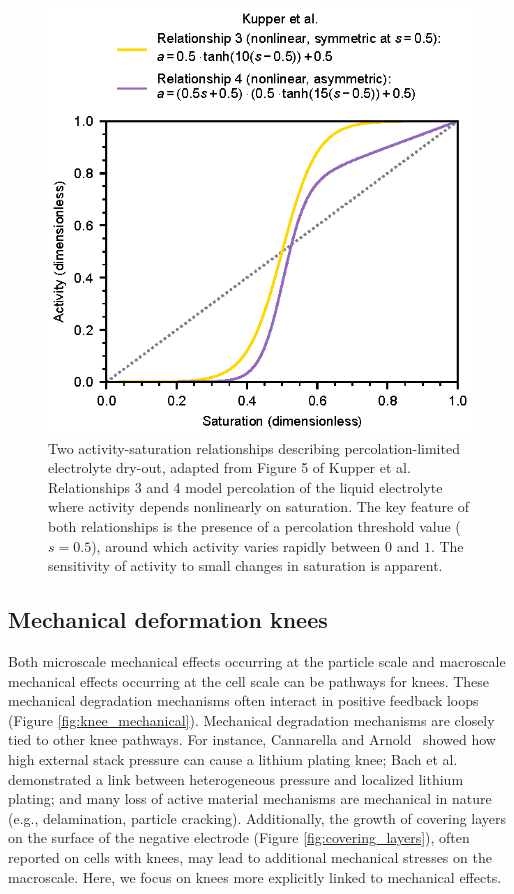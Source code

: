 \documentclass[journal=jpclcd,manuscript=article]{achemso}
\begin{document}
\begin{figure}[ht]
    \centering
    \includegraphics[scale=1.0]{figures/percolation.eps}
    \caption{Two activity-saturation relationships describing percolation-limited electrolyte dry-out, adapted from Figure 5 of Kupper et al.\cite{kupper_end--life_2018} Relationships 3 and 4 model percolation of the liquid electrolyte where activity depends nonlinearly on saturation. The key feature of both relationships is the presence of a percolation threshold value ($s=0.5$), around which activity varies rapidly between $0$ and $1$.
    The sensitivity of activity to small changes in saturation is apparent.}
    \label{fig:percolation}
\end{figure}

\subsection{Mechanical deformation knees}

Both microscale mechanical effects occurring at the particle scale and macroscale mechanical effects occurring at the cell scale can be pathways for knees.
These mechanical degradation mechanisms often interact in positive feedback loops (Figure \ref{fig:knee_mechanical}).
Mechanical degradation mechanisms are closely tied to other knee pathways. For instance, Cannarella and Arnold~\cite{cannarella_stress_2014} showed how high external stack pressure can cause a lithium plating knee; Bach et al.\cite{bach_nonlinear_2016} demonstrated a link between heterogeneous pressure and localized lithium plating; and many loss of active material mechanisms are mechanical in nature (e.g., delamination, particle cracking).
Additionally, the growth of covering layers on the surface of the negative electrode (Figure \ref{fig:covering_layers}), often reported on cells with knees, \cite{lewerenz_post-mortem_2017,willenberg_development_2020,stiaszny_electrochemical_2014, fang_capacity_2021} may lead to additional mechanical stresses on the macroscale.
Here, we focus on knees more explicitly linked to mechanical effects.
\end{document}
